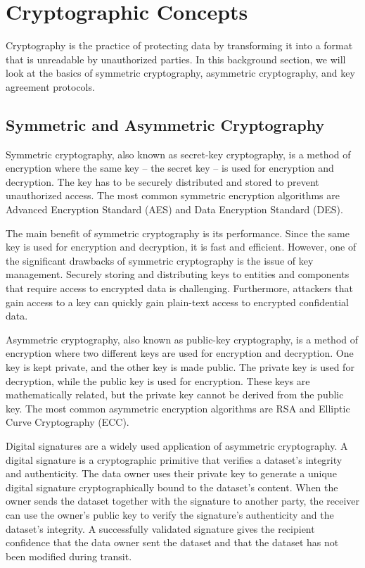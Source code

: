 \section{Cryptographic Concepts}
\label{sec:cryptographic-concepts}

Cryptography is the practice of protecting data by transforming it into a format
that is unreadable by unauthorized parties. In this background section, we will
look at the basics of symmetric cryptography, asymmetric cryptography, and key
agreement protocols.

\subsection{Symmetric and Asymmetric Cryptography}
\label{sec:symmetric-asymmetric-cryptography}

Symmetric cryptography, also known as secret-key cryptography, is a method of
encryption where the same key -- the secret key -- is used for encryption and
decryption. The key has to be securely distributed and stored to prevent
unauthorized access. The most common symmetric encryption algorithms are
Advanced Encryption Standard (AES) and Data Encryption Standard (DES).

The main benefit of symmetric cryptography is its performance. Since the same
key is used for encryption and decryption, it is fast and efficient. However,
one of the significant drawbacks of symmetric cryptography is the issue of key
management. Securely storing and distributing keys to entities and components
that require access to encrypted data is challenging. Furthermore, attackers
that gain access to a key can quickly gain plain-text access to encrypted
confidential data.

Asymmetric cryptography, also known as public-key cryptography, is a method of
encryption where two different keys are used for encryption and decryption. One
key is kept private, and the other key is made public. The private key is used
for decryption, while the public key is used for encryption. These keys are
mathematically related, but the private key cannot be derived from the public
key. The most common asymmetric encryption algorithms are RSA and Elliptic Curve
Cryptography (ECC).

Digital signatures are a widely used application of asymmetric cryptography. A
digital signature is a cryptographic primitive that verifies a dataset's
integrity and authenticity. The data owner uses their private key to generate a
unique digital signature cryptographically bound to the dataset's content. When
the owner sends the dataset together with the signature to another party, the
receiver can use the owner's public key to verify the signature's authenticity
and the dataset's integrity. A successfully validated signature gives the
recipient confidence that the data owner sent the dataset and that the dataset
has not been modified during transit.

